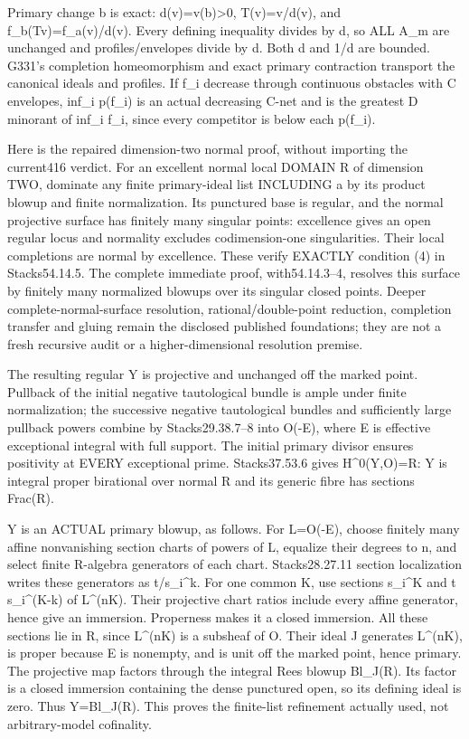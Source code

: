 \documentclass[11pt]{article}
\begin{document}
Primary change b is exact: d(v)=v(b)\textgreater{}0, T(v)=v/d(v), and f\_b(Tv)=f\_a(v)/d(v). Every defining inequality divides by d, so ALL A\_m are unchanged and profiles/envelopes divide by d. Both d and 1/d are bounded. G331's completion homeomorphism and exact primary contraction transport the canonical ideals and profiles. If f\_i decrease through continuous obstacles with C envelopes, inf\_i p(f\_i) is an actual decreasing C-net and is the greatest D minorant of inf\_i f\_i, since every competitor is below each p(f\_i).

Here is the repaired dimension-two normal proof, without importing the current416 verdict. For an excellent normal local DOMAIN R of dimension TWO, dominate any finite primary-ideal list INCLUDING a by its product blowup and finite normalization. Its punctured base is regular, and the normal projective surface has finitely many singular points: excellence gives an open regular locus and normality excludes codimension-one singularities. Their local completions are normal by excellence. These verify EXACTLY condition (4) in Stacks54.14.5. The complete immediate proof, with54.14.3--4, resolves this surface by finitely many normalized blowups over its singular closed points. Deeper complete-normal-surface resolution, rational/double-point reduction, completion transfer and gluing remain the disclosed published foundations; they are not a fresh recursive audit or a higher-dimensional resolution premise.

The resulting regular Y is projective and unchanged off the marked point. Pullback of the initial negative tautological bundle is ample under finite normalization; the successive negative tautological bundles and sufficiently large pullback powers combine by Stacks29.38.7--8 into O(-E), where E is effective exceptional integral with full support. The initial primary divisor ensures positivity at EVERY exceptional prime. Stacks37.53.6 gives H\textasciicircum{}0(Y,O)=R: Y is integral proper birational over normal R and its generic fibre has sections Frac(R).

Y is an ACTUAL primary blowup, as follows. For L=O(-E), choose finitely many affine nonvanishing section charts of powers of L, equalize their degrees to n, and select finite R-algebra generators of each chart. Stacks28.27.11 section localization writes these generators as t/s\_i\textasciicircum{}k. For one common K, use sections s\_i\textasciicircum{}K and t s\_i\textasciicircum{}(K-k) of L\textasciicircum{}(nK). Their projective chart ratios include every affine generator, hence give an immersion. Properness makes it a closed immersion. All these sections lie in R, since L\textasciicircum{}(nK) is a subsheaf of O. Their ideal J generates L\textasciicircum{}(nK), is proper because E is nonempty, and is unit off the marked point, hence primary. The projective map factors through the integral Rees blowup Bl\_J(R). Its factor is a closed immersion containing the dense punctured open, so its defining ideal is zero. Thus Y=Bl\_J(R). This proves the finite-list refinement actually used, not arbitrary-model cofinality.
\end{document}

